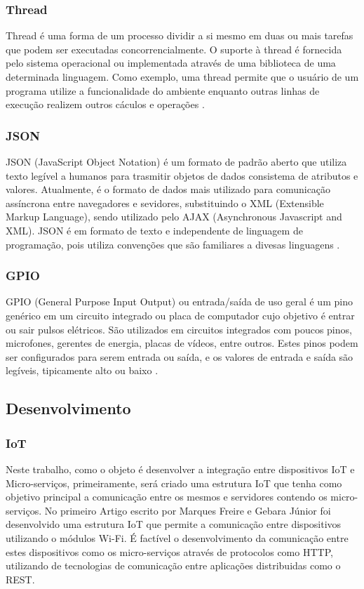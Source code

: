 \documentclass[journal]{IEEEtran}
\begin{document}
\subsubsection{Thread}
Thread é uma forma de um processo dividir a si mesmo em duas ou mais tarefas que podem ser executadas concorrencialmente. O suporte à thread é fornecida pelo sistema operacional ou implementada através de uma biblioteca de uma determinada linguagem. Como exemplo, uma thread permite que o usuário de um programa utilize a funcionalidade do ambiente enquanto outras linhas de execução realizem outros cáculos e operações \cite{tecmundothread}.

\subsubsection{JSON}
JSON (JavaScript Object Notation) é um formato de padrão aberto que utiliza texto legível a humanos para trasmitir objetos de dados consistema de atributos e valores. Atualmente, é o formato de dados mais utilizado para comunicação assíncrona entre navegadores e sevidores, substituindo o XML (Extensible Markup Language), sendo utilizado pelo AJAX (Asynchronous Javascript and XML). JSON é em formato de texto e independente de linguagem de programação, pois utiliza convenções que são familiares a divesas linguagens \cite{jsonpt}.

\subsubsection{GPIO}

GPIO (General Purpose Input Output) ou entrada/saída de uso geral é um pino genérico em um circuito integrado ou placa de computador cujo objetivo é entrar ou sair pulsos elétricos. São utilizados em circuitos integrados com poucos pinos, microfones, gerentes de energia, placas de vídeos, entre outros. Estes pinos podem ser configurados para serem entrada ou saída, e os valores de entrada e saída são legíveis, tipicamente alto ou baixo \cite[p.~3]{Sasang}.

\subsection{Desenvolvimento}
\subsubsection{IoT}

Neste trabalho, como o objeto é desenvolver a integração entre dispositivos IoT e Micro-serviços, primeiramente, será criado uma estrutura IoT que tenha como objetivo principal a comunicação entre os mesmos e servidores contendo os micro-serviços. No primeiro Artigo escrito por Marques Freire e Gebara Júnior \cite{freiregebaraiot} foi desenvolvido uma estrutura IoT que permite a comunicação entre dispositivos utilizando o módulos Wi-Fi. É factível o desenvolvimento da comunicação entre estes dispositivos como os micro-serviços através de protocolos como HTTP, utilizando de tecnologias de comunicação entre aplicações distribuidas como o REST.
\end{document}
